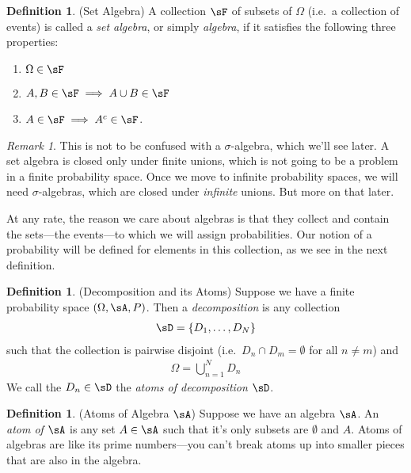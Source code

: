 \documentclass[12pt]{article}
\theoremstyle{plain}
\theoremstyle{definition}
\newtheorem{defn}[thm]{Definition}
\theoremstyle{remark}
\newtheorem*{rmk}{Remark}
\newcommand{\nN}{_{n=1}^N}
\begin{document}
\begin{defn}{(Set Algebra)}
A collection $\sF$ of subsets of $\Omega$ (i.e.\ a collection of
events) is called a \emph{set algebra}, or simply \emph{algebra}, if it
satisfies the following three properties:
\begin{enumerate}
  \item $\Omega\in\sF$
  \item $A,B\in\sF \implies A\cup B\in\sF$
  \item $A\in\sF\implies A^c\in\sF$.
\end{enumerate}
\end{defn}
\begin{rmk}
This is not to be confused with a $\sigma$-algebra, which we'll see
later. A set algebra is closed only under finite unions, which is not
going to be a problem in a finite probability space. Once we move to
infinite probability spaces, we will need $\sigma$-algebras, which are
closed under \emph{infinite} unions. But more on that later.

At any rate, the reason we care about algebras is that they collect and
contain the sets---the events---to which we will assign probabilities.
Our notion of a probability will be defined for elements in this
collection, as we see in the next definition.
\end{rmk}

\begin{defn}(Decomposition and its Atoms)
Suppose we have a finite probability space $(\Omega,\sA,P)$. Then a
\emph{decomposition} is any collection
\begin{align*}
  \sD = \{D_1,\ldots,D_N\}
\end{align*}
such that the collection is pairwise disjoint (i.e.\
$D_n\cap D_m=\emptyset$ for all $n\neq m$) and
\begin{align*}
  \Omega = \bigcup\nN D_n
\end{align*}
We call the $D_n\in\sD$ the \emph{atoms of decomposition $\sD$}.
\end{defn}

\begin{defn}(Atoms of Algebra $\sA$)
Suppose we have an algebra $\sA$. An \emph{atom of $\sA$} is any set
$A\in \sA$ such that it's only subsets are $\emptyset$ and $A$.  Atoms
of algebras are like its prime numbers---you can't break atoms up into
smaller pieces that are also in the algebra.
\end{defn}
\end{document}
